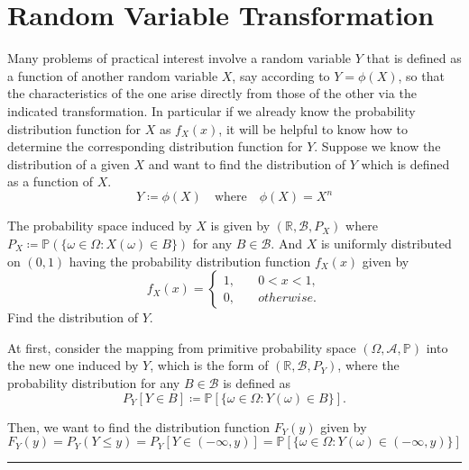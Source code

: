 \documentclass[twoside]{article}
\makeatletter
\theoremstyle{definition}
\theoremstyle{remark}
\theoremstyle{remark}
\newenvironment{example}
 {\patchcmd{\@thm}{\trivlist}{\list{}{\leftmargin=3em \rightmargin=3em}}{}{}%
  \vspace*{10\p@}
  \innerexample\pushQED{\hfill\ensuremath{\Diamond}}}
 {\popQED\endinnerexample}
\newenvironment{sol}{{\bf Solution:}}{\hfill\rule{2mm}{2mm}}
\makeatother
\begin{document}
\section{Random Variable Transformation}
Many problems of practical interest involve a random variable $Y$ that is defined
as a function of another random variable $X$, say according to $Y=\phi(X)$, so
that the characteristics of the one arise directly from those of the other via
the indicated transformation. In particular if we already know the probability
distribution function for $X$ as $f_X(x)$, it will be helpful to know how to
determine the corresponding distribution function for $Y$.
\begin{example}
  Suppose we know the distribution of a given $X$ and want to find the distribution
  of $Y$ which is defined as a function of $X$.
  \begin{equation*}
    Y \coloneqq \phi(X) \quad \textrm{where} \quad \phi(X) = X^n
  \end{equation*}

  The probability space induced by $X$ is given by $(\mathbb{R}, \mathcal{B}, P_X)$
  where $P_X \coloneqq \mathbb{P}({\{ \omega \in \Omega : X(\omega) \in B \}})$
  for any $B \in \mathcal{B}$. And $X$ is uniformly distributed on $(0, 1)$ having
  the probability distribution function $f_X(x)$ given by
  \begin{equation}
    f_X(x) =
    \left\{
    \begin{array}{ll}
      1, \quad & 0 < x < 1, \\
      0, \quad & otherwise.
    \end{array}
    \right.
  \end{equation}
  Find the distribution of $Y$.

  \begin{sol}
    At first, consider the mapping from primitive probability space $(\Omega, \mathcal{A}, \mathbb{P})$
    into the new one induced by $Y$, which is the form of  $(\mathbb{R}, \mathcal{B}, P_Y)$,
    where the probability distribution for any $B\in\mathcal{B}$ is defined as
    \begin{equation*}
      P_Y[Y \in B] \coloneqq \mathbb{P}[{\{ \omega \in \Omega : Y(\omega) \in B \}}].
    \end{equation*}

    Then, we want to find the distribution function $F_Y(y)$ given by
    \begin{equation*}
      F_Y(y) = P_Y(Y \leq y) = P_Y[Y \in (-\infty, y)]
      = \mathbb{P}[{\{ \omega \in \Omega : Y(\omega) \in (-\infty, y) \}}]
    \end{equation*}


\end{sol}
\end{example}
\end{document}
